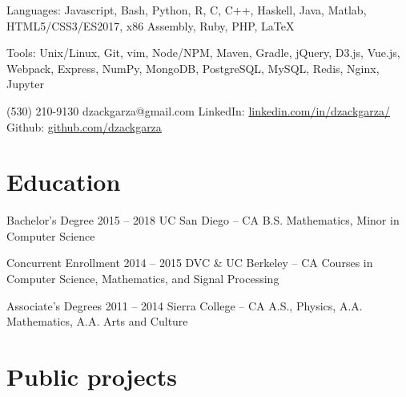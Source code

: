 \documentclass{tccv}
\begin{document}
\begin{eventlist}
\begin{factlist}

\item{Languages: }
     {Javascript, Bash, Python, R, C, C++, Haskell, Java, Matlab, HTML5/CSS3/ES2017, x86 Assembly, Ruby, PHP, \LaTeX}

\item{Tools: }
    {Unix/Linux, Git, vim, Node/NPM, Maven, Gradle, jQuery, D3.js, Vue.js, Webpack, Express, NumPy, MongoDB, PostgreSQL, MySQL, Redis, Nginx, Jupyter}

\end{factlist}

\end{eventlist}

    {(530) 210-9130}
    {dzackgarza@gmail.com}
    {LinkedIn: \href{http://www.linkedin.com/in/dzackgarza/}{linkedin.com/in/dzackgarza/} \newline
    Github: \href{https://www.github.com/dzackgarza}{github.com/dzackgarza}}


\section{Education}

\begin{yearlist}

\item[Bachelor's Degree]{2015 -- 2018}
     {UC San Diego -- CA}
     {B.S. Mathematics, Minor in Computer Science}

\item[Concurrent Enrollment]{2014 -- 2015}
     {DVC \& UC Berkeley -- CA}
     {Courses in Computer Science, Mathematics, and Signal Processing}

\item[Associate's Degrees]{2011 -- 2014}
    {Sierra College -- CA}
    {A.S., Physics, A.A. Mathematics, A.A. Arts and Culture}

\end{yearlist}

\section{Public projects}
\end{document}
